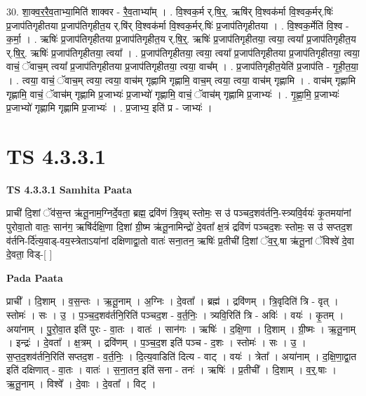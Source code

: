 \documentclass[17pt]{extarticle}
\begin{document}
30. शा॒क्व॒र॒रै॒व॒ताभ्या॒मिति॑ शाक्वर - रै॒व॒ताभ्या᳚म् । . वि॒श्वक॒र्म र्.षि॒र्॒. ऋषि॑र् वि॒श्वक॑र्मा वि॒श्वक॒र्मर्.षिः॑ प्र॒जाप॑तिगृहीतया प्र॒जाप॑तिगृहीत॒य र्.षि॑र् वि॒श्वक॑र्मा वि॒श्वक॒र्मर्.षिः॑ प्र॒जाप॑तिगृहीतया । . वि॒श्वक॒र्मेति॑ वि॒श्व - क॒र्मा॒ । . ऋषिः॑ प्र॒जाप॑तिगृहीतया प्र॒जाप॑तिगृहीत॒य र्.षि॒र्॒. ऋषिः॑ प्र॒जाप॑तिगृहीतया॒ त्वया॒ त्वया᳚ प्र॒जाप॑तिगृहीत॒य र्.षि॒र्॒. ऋषिः॑ प्र॒जाप॑तिगृहीतया॒ त्वया᳚ । . प्र॒जाप॑तिगृहीतया॒ त्वया॒ त्वया᳚ प्र॒जाप॑तिगृहीतया प्र॒जाप॑तिगृहीतया॒ त्वया॒ वाचं॒ ॅवाच॒म् त्वया᳚ प्र॒जाप॑तिगृहीतया प्र॒जाप॑तिगृहीतया॒ त्वया॒ वाच᳚म् । . प्र॒जाप॑तिगृहीत॒येति॑ प्र॒जाप॑ति - गृ॒ही॒त॒या॒ । . त्वया॒ वाचं॒ ॅवाच॒म् त्वया॒ त्वया॒ वाच॑म् गृह्णामि गृह्णामि॒ वाच॒म् त्वया॒ त्वया॒ वाच॑म् गृह्णामि । . वाच॑म् गृह्णामि गृह्णामि॒ वाचं॒ ॅवाच॑म् गृह्णामि प्र॒जाभ्यः॑ प्र॒जाभ्यो॑ गृह्णामि॒ वाचं॒ ॅवाच॑म् गृह्णामि प्र॒जाभ्यः॑ । . गृ॒ह्णा॒मि॒ प्र॒जाभ्यः॑ प्र॒जाभ्यो॑ गृह्णामि गृह्णामि प्र॒जाभ्यः॑ । . प्र॒जाभ्य॒ इति॑ प्र - जाभ्यः॑ । \newline
\pagebreak
{}

\section{ TS 4.3.3.1 }

\textbf{TS 4.3.3.1 } \newline
\textbf{Samhita Paata} \newline

प्राची॑ दि॒शां ॅव॑स॒न्त ऋ॑तू॒नाम॒ग्निर्दे॒वता॒ ब्रह्म॒ द्रवि॑णं त्रि॒वृथ् स्तोमः॒ स उ॑ पञ्चद॒शव॑र्तनि॒-स्त्र्यवि॒र्वयः॑ कृ॒तमया॑नां पुरोवा॒तो वातः॒ सान॑ग॒ ऋषि॑र्दक्षि॒णा दि॒शां ग्री॒ष्म ऋ॑तू॒नामिन्द्रो॑ दे॒वता᳚ क्ष॒त्रं द्रवि॑णं पञ्चद॒शः स्तोमः॒ स उ॑ सप्तद॒श व॑र्तनि-र्दि॑त्य॒वाड्-वय॒स्त्रेताऽया॑नां दक्षिणाद्वा॒तो वातः॑ सना॒तन॒ ऋषिः॑ प्र॒तीची॑ दि॒शां ॅव॒र्॒.षा ऋ॑तू॒नां ॅविश्वे॑ दे॒वा दे॒वता॒ विड्-[  ] \newline

\textbf{Pada Paata} \newline

प्राची᳚ । दि॒शाम् । व॒स॒न्तः । ऋ॒तू॒नाम् । अ॒ग्निः । दे॒वता᳚ । ब्रह्म॑ । द्रवि॑णम् । त्रि॒वृदिति॑ त्रि - वृत् । स्तोमः॑ । सः । उ॒ । प॒ञ्च॒द॒शव॑र्तनि॒रिति॑ पञ्चद॒श - व॒र्त॒निः॒ । त्र्यवि॒रिति॑ त्रि - अविः॑ । वयः॑ । कृ॒तम् । अया॑नाम् । पु॒रो॒वा॒त इति॑ पुरः - वा॒तः । वातः॑ । सान॑गः । ऋषिः॑ । द॒क्षि॒णा । दि॒शाम् । ग्री॒ष्मः । ऋ॒तू॒नाम् । इन्द्रः॑ । दे॒वता᳚ । क्ष॒त्रम् । द्रवि॑णम् । प॒ञ्च॒द॒श इति॑ पञ्च - द॒शः । स्तोमः॑ । सः । उ॒ । स॒प्त॒द॒शव॑र्तनि॒रिति॑ सप्तद॒श - व॒र्त॒निः॒ । दि॒त्य॒वाडिति॑ दित्य - वाट् । वयः॑ । त्रेता᳚ । अया॑नाम् । द॒क्षि॒णा॒द्वा॒त इति॑ दक्षिणात् - वा॒तः । वातः॑ । स॒ना॒तन॒ इति॑ सना - तनः॑ । ऋषिः॑ । प्र॒तीची᳚ । दि॒शाम् । व॒र्॒.षाः । ऋ॒तू॒नाम् । विश्वे᳚ । दे॒वाः । दे॒वता᳚ । विट् ।  \newline
\end{document}
